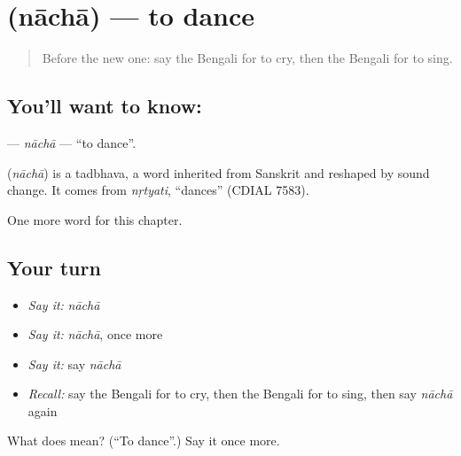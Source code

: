 \section[\texorpdfstring{\bn{নাচা} (nāchā)}{নাচা (nāchā)}]{ (nāchā) — to dance}

\label{lesson:BN-C50-nacha}



\begin{quote}
Before the new one: say the Bengali for to cry, then the Bengali for to sing.
\end{quote}

\subsection*{You'll want to know: }
\textbf{} — \emph{nāchā} — \textquotedblleft{}to dance\textquotedblright{}.

\begin{cousinweb}
\textbf{} (\emph{nāchā}) is a tadbhava, a word inherited from Sanskrit and reshaped by sound change. It comes from \emph{nṛtyati}, \textquotedblleft{}dances\textquotedblright{} (CDIAL 7583).
\end{cousinweb}

\begin{grammarlens}[title={What you've built}]
One more word for this chapter.
\end{grammarlens}

\subsection*{Your turn}
\begin{itemize}
\raggedright
  \item \emph{Say it:} \emph{nāchā}
  \item \emph{Say it:} \emph{nāchā}, once more
  \item \emph{Say it:} say \emph{nāchā}
  \item \emph{Recall:} say the Bengali for to cry, then the Bengali for to sing, then say \emph{nāchā} again
\end{itemize}

\begin{tcolorbox}[breakable,colback=teal!4,colframe=teal!35!black,title={Before you move on}]
What does  mean? (\textquotedblleft{}To dance\textquotedblright{}.) Say it once more.
\end{tcolorbox}
